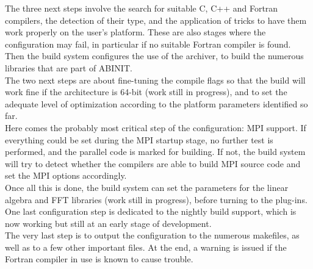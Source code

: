 The three next steps involve the search for suitable C, C++ and Fortran
compilers, the detection of their type, and the application of tricks to
have them work properly on the user's platform. These are also stages
where the configuration may fail, in particular if no suitable Fortran
compiler is found.
\\

Then the build system configures the use of the archiver, to build the
numerous libraries that are part of ABINIT.
\\

The two next steps are about fine-tuning the compile flags so that the
build will work fine if the architecture is 64-bit (work still in
progress), and to set the adequate level of optimization according to
the platform parameters identified so far.
\\

Here comes the probably most critical step of the configuration: MPI
support. If everything could be set during the MPI startup stage, no
further test is performed, and the parallel code is marked for building.
If not, the build system will try to detect whether the compilers are
able to build MPI source code and set the MPI options accordingly.
\\

Once all this is done, the build system can set the parameters for the
linear algebra and FFT libraries (work still in progress), before
turning to the plug-ins.
\\

One last configuration step is dedicated to the nightly build support,
which is now working but still at an early stage of development.
\\

The very last step is to output the configuration to the numerous
makefiles, as well as to a few other important files. At the end, a
warning is issued if the Fortran compiler in use is known to cause
trouble.
